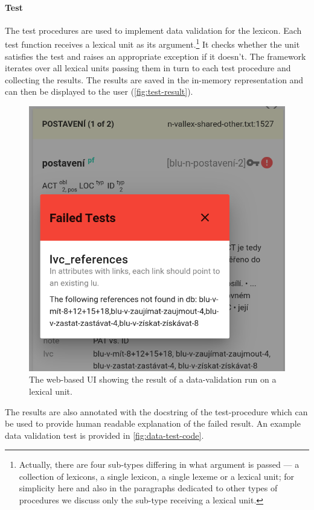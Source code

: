 \documentclass[10pt, a4paper]{article}
\begin{document}
\paragraph{Test} The test procedures are used to implement data validation for the lexicon. Each test
function receives a lexical unit as its argument.\footnote{Actually, there are four sub-types differing in what
argument is passed --- a collection of lexicons, a single lexicon, a single lexeme or a lexical unit;
for simplicity here and also in the paragraphs dedicated to other types of procedures we discuss only the sub-type receiving a lexical unit.}
It checks whether the unit satisfies the test and raises an appropriate exception if it doesn't. The framework
iterates over all lexical units passing them in turn to each test procedure and collecting the results. The
results are saved in the in-memory representation and can then be displayed to the user (\autoref{fig:test-result}).
\begin{figure}
    \includegraphics[width=\hsize]{images/test-result.png}
    \caption{\label{fig:test-result}The web-based UI showing the result of a data-validation run on a lexical unit.}
\end{figure}
The results are also annotated with the docstring of the test-procedure which can be used to provide human
readable explanation of the failed result. An example data validation test is provided in \autoref{fig:data-test-code}.
\end{document}
